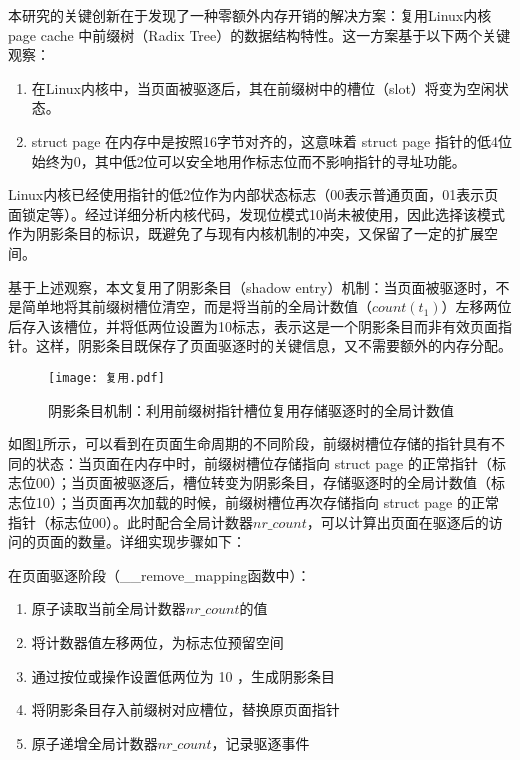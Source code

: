 本研究的关键创新在于发现了一种零额外内存开销的解决方案：复用Linux内核 page cache 中前缀树（Radix Tree）的数据结构特性。这一方案基于以下两个关键观察：

\begin{enumerate}
  \item 在Linux内核中，当页面被驱逐后，其在前缀树中的槽位（slot）将变为空闲状态。
  \item  struct page 在内存中是按照16字节对齐的，这意味着 struct page 指针的低4位始终为0，其中低2位可以安全地用作标志位而不影响指针的寻址功能。
\end{enumerate}

Linux内核已经使用指针的低2位作为内部状态标志（00表示普通页面，01表示页面锁定等）。经过详细分析内核代码，发现位模式10尚未被使用，因此选择该模式作为阴影条目的标识，既避免了与现有内核机制的冲突，又保留了一定的扩展空间。

基于上述观察，本文复用了阴影条目（shadow entry）机制：当页面被驱逐时，不是简单地将其前缀树槽位清空，而是将当前的全局计数值（\(count(t_1)\)）左移两位后存入该槽位，并将低两位设置为10标志，表示这是一个阴影条目而非有效页面指针。这样，阴影条目既保存了页面驱逐时的关键信息，又不需要额外的内存分配。

\begin{figure}[htbp]
  \centering
  \texttt{[image: 复用.pdf]}
  \caption{阴影条目机制：利用前缀树指针槽位复用存储驱逐时的全局计数值}
  \label{fig:复用}
\end{figure}

如图\ref{fig:复用}所示，可以看到在页面生命周期的不同阶段，前缀树槽位存储的指针具有不同的状态：当页面在内存中时，前缀树槽位存储指向 struct page 的正常指针（标志位00）；当页面被驱逐后，槽位转变为阴影条目，存储驱逐时的全局计数值（标志位10）；当页面再次加载的时候，前缀树槽位再次存储指向 struct page 的正常指针（标志位00）。此时配合全局计数器\(nr\_count\)，可以计算出页面在驱逐后的访问的页面的数量。详细实现步骤如下：

在页面驱逐阶段（\_\_remove\_mapping函数中）：
\begin{enumerate}
  \item 原子读取当前全局计数器\(nr\_count\)的值
  \item 将计数器值左移两位，为标志位预留空间
  \item 通过按位或操作设置低两位为 10 ，生成阴影条目
  \item 将阴影条目存入前缀树对应槽位，替换原页面指针
  \item 原子递增全局计数器\(nr\_count\)，记录驱逐事件
\end{enumerate}

